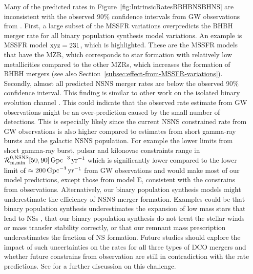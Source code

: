 \documentclass[twocolumn]{aastex63}
\newcommand{\floor}[1]{\textbf{\textcolor{magenta}{[Floor: #1]}}}
\newcommand\rate{\mathcal{R}}
\newcommand{\yearmin}{\ensuremath{\,\rm{yr}^{-1}}\xspace}
\newcommand{\GpcminThree}{\ensuremath{\,\rm{Gpc}^{-3}}\xspace}
\begin{document}
Many of the  predicted rates in Figure~\ref{fig:IntrinsicRatesBBHBNSBHNS} are inconsistent with the observed $90\%$ confidence intervals from \ac{GW} observations from \citep{2019PhRvX...9c1040A,2020arXiv200101761T}. 
First, a large subset of the \ac{MSSFR} variations overpredicts the  \ac{BHBH} merger rate for all binary population synthesis model variations. An example is \ac{MSSFR} model $\rm{xyz} =231$, which is highlighted. These are the \ac{MSSFR} models that have the  \citet{2006ApJ...638L..63L}   MZR, which corresponds to star formation with relatively low metallicities  compared to the other MZRs, which increases the formation of \ac{BHBH} mergers (see also Section~\ref{subsec:effect-from-MSSFR-variations}).
Secondly,   almost all  predicted \ac{NSNS} merger rates  are below the observed 90$\%$ confidence interval.  
 This finding is similar to other work on the isolated binary evolution channel  \citep[e.g.,][]{2018MNRAS.474.2937C}. This could indicate  that the observed rate estimate from \ac{GW} observations might be an over-prediction caused by the small number of detections. This is especially likely since the current \ac{NSNS} constrained rate from \ac{GW}  observations is also higher compared to estimates from short gamma-ray bursts and the galactic \ac{NSNS} population. For example the lower limits from short gamma-ray burst, pulsar and kilonovae constraints range in $\rate_{\rm{m, min}}^{0,\rm{NSNS}} [50, 90]\GpcminThree \yearmin$ \citep{2012MNRAS.425.2668C, 2013ApJ...767..140P,2015ApJ...815..102F,2016NatCo...712898J} which is significantly lower compared to the lower limit of $\approx 200\GpcminThree \yearmin$ from \ac{GW} observations and would make most of our model predictions, except those from model E,  consistent with the constrains from observations.  
  Alternatively,   our binary population synthesis models might underestimate the efficiency of \ac{NSNS} merger formation. Examples could be that  binary population synthesis underestimates the expansion of low mass stars that lead to NSs \citep{2020arXiv200301120L}, that our binary population synthesis do not treat the stellar winds or mass transfer stability correctly,  or that our remnant mass prescription underestimates the fraction of \ac{NS} formation. Future studies should explore the impact of such uncertainties on the rates for all three types of \ac{DCO} mergers and whether future  constrains from observation are still in contradiction with the rate predictions. 
  See \citet{2018MNRAS.474.2937C} for a further discussion on this challenge. 
 
\end{document}
